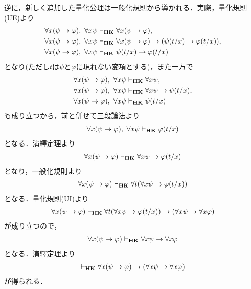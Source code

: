 	逆に，新しく追加した量化公理は一般化規則から導かれる．実際，量化規則(UE)より
	\begin{align}
		\forall x (\psi \rightarrow \varphi),\ \forall x \psi &\vdash_{{\scriptsize \mbox{{\bf HK}}}} \forall x (\psi \rightarrow \varphi), \\
		\forall x (\psi \rightarrow \varphi),\ \forall x \psi &\vdash_{{\scriptsize \mbox{{\bf HK}}}} \forall x (\psi \rightarrow \varphi)
		\rightarrow (\psi(t/x) \rightarrow \varphi(t/x)), \\
		\forall x (\psi \rightarrow \varphi),\ \forall x \psi &\vdash_{{\scriptsize \mbox{{\bf HK}}}} \psi(t/x) \rightarrow \varphi(t/x)
	\end{align}
	となり(ただし$t$は$\psi$と$\varphi$に現れない変項とする)，また一方で
	\begin{align}
		\forall x (\psi \rightarrow \varphi),\ \forall x \psi &\vdash_{{\scriptsize \mbox{{\bf HK}}}} \forall x \psi, \\
		\forall x (\psi \rightarrow \varphi),\ \forall x \psi &\vdash_{{\scriptsize \mbox{{\bf HK}}}} \forall x \psi \rightarrow \psi(t/x), \\
		\forall x (\psi \rightarrow \varphi),\ \forall x \psi &\vdash_{{\scriptsize \mbox{{\bf HK}}}} \psi(t/x)
	\end{align}
	も成り立つから，前と併せて三段論法より
	\begin{align}
		\forall x (\psi \rightarrow \varphi),\ \forall x \psi \vdash_{{\scriptsize \mbox{{\bf HK}}}} \varphi(t/x)
	\end{align}
	となる．演繹定理より
	\begin{align}
		\forall x (\psi \rightarrow \varphi) \vdash_{{\scriptsize \mbox{{\bf HK}}}} \forall x \psi  \rightarrow \varphi(t/x)
	\end{align}
	となり，一般化規則より
	\begin{align}
		\forall x (\psi \rightarrow \varphi) \vdash_{{\scriptsize \mbox{{\bf HK}}}} \forall t ( \forall x \psi  \rightarrow \varphi(t/x))
	\end{align}
	となる．量化規則(UI)より
	\begin{align}
		\forall x (\psi \rightarrow \varphi) \vdash_{{\scriptsize \mbox{{\bf HK}}}} \forall t ( \forall x \psi  \rightarrow \varphi(t/x)) \rightarrow
		(\forall x \psi \rightarrow \forall x \varphi)
	\end{align}
	が成り立つので，
	\begin{align}
		\forall x (\psi \rightarrow \varphi) \vdash_{{\scriptsize \mbox{{\bf HK}}}}
		\forall x \psi \rightarrow \forall x \varphi
	\end{align}
	となる．演繹定理より
	\begin{align}
		\vdash_{{\scriptsize \mbox{{\bf HK}}}} \forall x (\psi \rightarrow \varphi)
		\rightarrow (\forall x \psi \rightarrow \forall x \varphi)
	\end{align}
	が得られる．